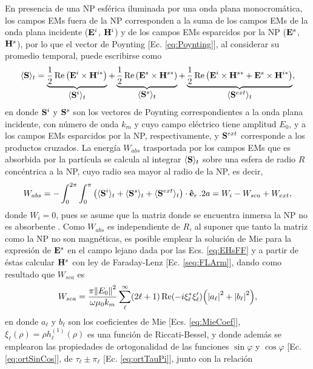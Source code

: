 En presencia de una NP esférica iluminada por una onda plana monocromática, los campos EMs fuera de la NP corresponden a la suma de los campos EMs de la onda plana incidente ($\vb{E}^i$, $\vb{H}^i$) y de los campos EMs esparcidos por la NP ($\vb{E}^s$, $\vb{H}^s$), por lo que el vector de Poynting [Ec. \eqref{eq:Poynting}], al considerar su promedio temporal, puede escribirse como \cite{bohren1998absorption}
%
\begin{align*}
\langle\vb{S}\rangle_t 
		= \underbrace{\frac12 \Re \qty(\vb{E}^i\times\vb{H}^{i*})}_{\text{\normalsize $\langle\vb{S}^i\rangle_t $}} + 
		\underbrace{\frac12 \Re \qty(\vb{E}^s\times\vb{H}^{s*})}_{\text{\normalsize $\langle\vb{S}^s\rangle_t $}}+
		\underbrace{	\frac12 \Re\qty(\vb{E}^i\times\vb{H}^{s*} + \vb{E}^s\times\vb{H}^{i*})}_{\text{\normalsize$\langle\vb{S}^{ext}\rangle_t $}},
\end{align*}
%
en donde $\vb{S}^i$ y $\vb{S}^s$ son los vectores de Poynting correspondientes a la onda plana incidente, con número de onda $k_m$ y cuyo campo eléctrico tiene amplitud $E_0$, y a los campos EMs esparcidos por la NP, respectivamente, y $\vb{S}^{ext}$ corresponde a los productos cruzados. La energía $W_{abs}$ trasportada por los campos EMs que es absorbida por la partícula se calcula al integrar $\langle\vb{S}\rangle_t$ sobre una esfera de radio $R$ concéntrica a la NP, cuyo radio sea mayor al radio de la NP, es decir,
%
\begin{equation}
W_{abs} = - \int_0^{2\pi}\int_0^{\pi}
		\qty(\langle\vb{S}^i\rangle_t +\langle\vb{S}^s\rangle_t 
				+\langle\vb{S}^{ext}\rangle_t )
		\cdot \vu{e}_r \,.2 a
		 = W_i-W_{sca}+W_{ext},
		 \label{eq:WaAll}
\end{equation}
%
donde $W_i = 0$, pues se asume que la matriz donde se encuentra inmersa la NP no es absorbente \cite{bohren1998absorption}. Como $W_{abs}$ es independiente de $R$, al suponer que tanto la matriz como la NP no son magnéticas, es posible emplear la solución de Mie para la expresión de $\vb{E}^s$ en el campo lejano dada por las Ecs. \eqref{eq:EHsFF} y a partir de éstas calcular $\vb{H}^s$ con ley de Faraday-Lenz [Ec. \eqref{seq:FLArm}], dando como resultado que $W_{sca}$ es \cite{bohren1998absorption}
%
 	\begin{equation}
W_{sca} = \frac{\pi\norm{E_0}^2}{\omega\mu_0 k_m}
		\sum_\ell^\infty (2\ell+1)\Re(-i\xi_\ell^*\xi_\ell')\qty(\abs{a_\ell}^2+\abs{b_\ell}^2),
	\label{eq:WsAll}
	\end{equation}
%
en donde $a_\ell$ y $b_\ell$ son los coeficientes de Mie [Ecs.  \eqref{eq:MieCoef}], $\xi_\ell(\rho) = \rho h_\ell^{(1)}(\rho)$ es una función de Riccati-Bessel, y donde además se emplearon las propiedades de ortogonalidad de las funciones $\sin\varphi$ y $\cos\varphi$ [Ec. \eqref{eq:ortSinCos}], de $\tau_\ell\pm\pi_\ell$ [Ec. \eqref{eq:ortTauPi}], junto con la relación \cite{bohren1998absorption}
